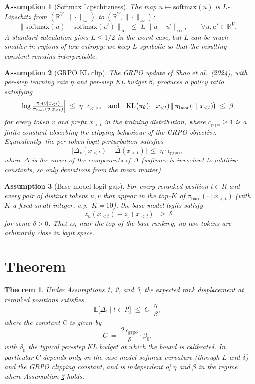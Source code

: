 \documentclass[11pt]{article}
\newtheorem{theorem}{Theorem}
\newtheorem{assumption}{Assumption}
\begin{document}
\begin{assumption}[Softmax Lipschitzness]\label{ass:lipschitz}
The map $u \mapsto \mathrm{softmax}(u)$ is $L$-Lipschitz from
$(\mathbb{R}^V, \|\cdot\|_\infty)$ to $(\mathbb{R}^V, \|\cdot\|_\infty)$:
\[
\bigl\| \mathrm{softmax}(u) - \mathrm{softmax}(u') \bigr\|_\infty
\;\le\; L \, \|u - u'\|_\infty, \qquad \forall u, u' \in \mathbb{R}^V.
\]
A standard calculation gives $L \le 1/2$ in the worst case, but $L$ can
be much smaller in regions of low entropy; we keep $L$ symbolic so that
the resulting constant remains interpretable.
\end{assumption}

\begin{assumption}[GRPO KL clip]\label{ass:grpo}
The GRPO update of Shao et al.\ (2024), with per-step learning rate
$\eta$ and per-step KL budget $\beta$, produces a policy ratio satisfying
\[
\Bigl| \log \tfrac{\pi_\theta(v \mid x_{<t})}{\pi_{\text{base}}(v \mid x_{<t})} \Bigr|
\;\le\; \eta \cdot c_{\text{grpo}}
\quad\text{and}\quad
\mathrm{KL}\bigl(\pi_\theta(\cdot \mid x_{<t}) \,\|\, \pi_{\text{base}}(\cdot \mid x_{<t})\bigr)
\;\le\; \beta,
\]
for every token $v$ and prefix $x_{<t}$ in the training distribution,
where $c_{\text{grpo}} \ge 1$ is a finite constant absorbing the
clipping behaviour of the GRPO objective. Equivalently, the per-token
logit perturbation satisfies
\[
\bigl| \Delta_v(x_{<t}) - \overline{\Delta}(x_{<t}) \bigr| \;\le\; \eta \cdot c_{\text{grpo}},
\]
where $\overline{\Delta}$ is the mean of the components of $\Delta$
(softmax is invariant to additive constants, so only deviations from the
mean matter).
\end{assumption}

\begin{assumption}[Base-model logit gap]\label{ass:gap}
For every reranked position $t \in R$ and every pair of distinct tokens
$u, v$ that appear in the top--$K$ of $\pi_{\text{base}}(\cdot \mid x_{<t})$
(with $K$ a fixed small integer, e.g.\ $K = 10$), the base-model logits
satisfy
\[
\bigl| z_u(x_{<t}) - z_v(x_{<t}) \bigr| \;\ge\; \delta
\]
for some $\delta > 0$. That is, near the top of the base ranking, no two
tokens are arbitrarily close in logit space.
\end{assumption}

\section*{Theorem}

\begin{theorem}\label{thm:main}
Under Assumptions \ref{ass:lipschitz}, \ref{ass:grpo}, and
\ref{ass:gap}, the expected rank displacement at reranked positions
satisfies
\[
\mathbb{E}\bigl[\Delta_t \mid t \in R\bigr] \;\le\; C \cdot \frac{\eta}{\beta},
\]
where the constant $C$ is given by
\[
C \;=\; \frac{2 \, c_{\text{grpo}}}{\delta} \cdot \beta_0,
\]
with $\beta_0$ the typical per-step KL budget at which the bound is
calibrated. In particular $C$ depends only on the base-model softmax
curvature (through $L$ and $\delta$) and the GRPO clipping constant, and
is independent of $\eta$ and $\beta$ in the regime where Assumption
\ref{ass:grpo} holds.
\end{theorem}
\end{document}
